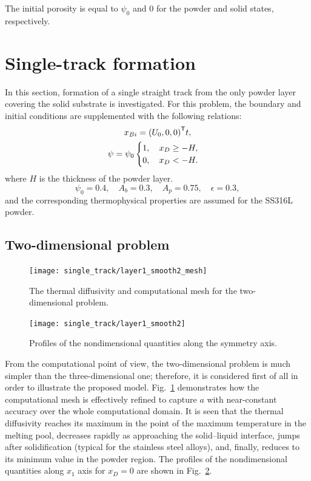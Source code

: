 \documentclass{article}
\newcommand{\transpose}[1]{#1^\mathsf{T}}
\begin{document}
The initial porosity is equal to \(\psi_0\) and \(0\) for the powder and solid states, respectively.

\section{Single-track formation}

In this section, formation of a single straight track from the only powder layer covering the solid substrate is investigated.
For this problem, the boundary and initial conditions are supplemented with the following relations:
\begin{gather}
    x_{Bi} = \transpose{\qty(U_0,0,0)}t, \label{eq:single:bc} \\
    \psi = \psi_0\begin{cases}
        1, \quad x_D \geq -H, \\
        0, \quad x_D < -H.
    \end{cases}\label{eq:single:ic}
\end{gather}
where \(H\) is the thickness of the powder layer.
\begin{equation}\label{eq:single:params}
    \psi_0 = 0.4, \quad A_b = 0.3, \quad A_p = 0.75, \quad \epsilon = 0.3,
\end{equation}
and the corresponding thermophysical properties are assumed for the SS316L powder.

\subsection{Two-dimensional problem}

\begin{figure}
    \centering
    \texttt{[image: single\_track/layer1\_smooth2\_mesh]}
    \caption{
        The thermal diffusivity and computational mesh for the two-dimensional problem.
    }\label{fig:2d:mesh}
\end{figure}

\begin{figure}
    \centering
    \texttt{[image: single\_track/layer1\_smooth2]}
    \caption{
        Profiles of the nondimensional quantities along the symmetry axis.
    }\label{fig:2d:profiles}
\end{figure}

From the computational point of view, the two-dimensional problem is much simpler than the three-dimensional one;
therefore, it is considered first of all in order to illustrate the proposed model.
Fig.~\ref{fig:2d:mesh} demonstrates how the computational mesh is effectively refined
to capture \(a\) with near-constant accuracy over the whole computational domain.
It is seen that the thermal diffusivity reaches its maximum in the point of the maximum temperature in the melting pool,
decreases rapidly as approaching the solid--liquid interface, jumps after solidification (typical for the stainless steel alloys),
and, finally, reduces to its minimum value in the powder region.
The profiles of the nondimensional quantities along \(x_1\) axis for \(x_D=0\) are shown in Fig.~\ref{fig:2d:profiles}.
\end{document}
